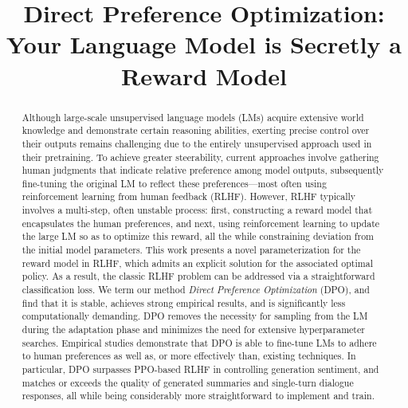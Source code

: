 \title{Direct Preference Optimization: Your Language Model is Secretly a Reward Model}

\begin{abstract}
Although large-scale unsupervised language models (LMs) acquire extensive world knowledge and demonstrate certain reasoning abilities, exerting precise control over their outputs remains challenging due to the entirely unsupervised approach used in their pretraining. To achieve greater steerability, current approaches involve gathering human judgments that indicate relative preference among model outputs, subsequently fine-tuning the original LM to reflect these preferences—most often using reinforcement learning from human feedback (RLHF). However, RLHF typically involves a multi-step, often unstable process: first, constructing a reward model that encapsulates the human preferences, and next, using reinforcement learning to update the large LM so as to optimize this reward, all the while constraining deviation from the initial model parameters. This work presents a novel parameterization for the reward model in RLHF, which admits an explicit solution for the associated optimal policy. As a result, the classic RLHF problem can be addressed via a straightforward classification loss. We term our method \textit{Direct Preference Optimization} (DPO), and find that it is stable, achieves strong empirical results, and is significantly less computationally demanding. DPO removes the necessity for sampling from the LM during the adaptation phase and minimizes the need for extensive hyperparameter searches. Empirical studies demonstrate that DPO is able to fine-tune LMs to adhere to human preferences as well as, or more effectively than, existing techniques. In particular, DPO surpasses PPO-based RLHF in controlling generation sentiment, and matches or exceeds the quality of generated summaries and single-turn dialogue responses, all while being considerably more straightforward to implement and train.
\end{abstract}

